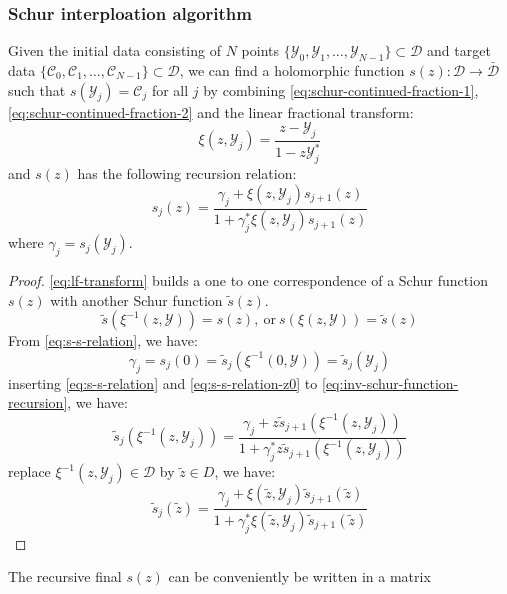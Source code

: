 \documentclass[
	preprint,%
	aps,
	prb,
	showpacs,	
	amsmath, amssymb]{revtex4-2}
\newcommand{\Y}{ {\mathcal{Y}} }
\newcommand{\C}{ {\mathcal{C}} }
\newcommand{\D}{ {\mathcal{D}} }
\newcommand{\Dbar}{ {\bar{\mathcal{D}}} }
\begin{document}
\subsubsection{Schur interploation algorithm}
\label{subsubsec:schur-interpolation-problem}
Given the initial data consisting of $N$ points 
$\{\Y_0, \Y_1, \dots ,\Y_{N-1}\} \subset \D$ and target data
$\{\C_0, \C_1, \dots ,\C_{N-1}\} \subset \D$, 
we can find a holomorphic function $s(z): \D \to \Dbar$ 
such that $s(\Y_j) = \C_j$ for all $j$ by combining 
\cref{eq:schur-continued-fraction-1}, \cref{eq:schur-continued-fraction-2} 
and the linear fractional transform:
\begin{equation}\label{eq:lf-transform}
	\xi(z, \Y_j) = \frac{z - \Y_j}{1 - z\Y_j^*}
\end{equation}
and $s(z)$ has the following recursion relation:
\begin{equation}\label{eq:inv-schur-function-recursion-another-s}
	s_j(z) 
	= \frac{\gamma_j + \xi(z, \Y_j) s_{j+1}(z) }
		{1 + \gamma_j^* \xi(z, \Y_j) s_{j+1}(z)}
\end{equation}
where $\gamma_j = s_j(\Y_j)$.
\begin{proof}
	\cref{eq:lf-transform} builds a one to one correspondence of 
	a Schur function $s(z)$ with another Schur function $\tilde{s}(z)$.
	\begin{equation}\label{eq:s-s-relation}
		\tilde{s}(\xi^{-1}(z, \Y)) = s(z), \ 
		\mathrm{or} \ s(\xi(z, \Y)) = \tilde{s}(z)
	\end{equation}
	From \cref{eq:s-s-relation}, we have:
	\begin{equation}\label{eq:s-s-relation-z0}
		\gamma_j = s_j(0) = \tilde{s}_j(\xi^{-1}(0, \Y)) 
			= \tilde{s}_j(\Y_j)
	\end{equation}
	inserting \cref{eq:s-s-relation} and \cref{eq:s-s-relation-z0}
	to \cref{eq:inv-schur-function-recursion}, we have: 
	\begin{equation}
		\tilde{s}_j(\xi^{-1}(z, \Y_j)) 
		= \frac{\gamma_j + z \tilde{s}_{j+1}(\xi^{-1}(z, \Y_j)) }
			{1 + \gamma_j^* z \tilde{s}_{j+1}(\xi^{-1}(z, \Y_j))}
	\end{equation}
	replace $\xi^{-1}(z, \Y_j) \in \D$ by $\tilde{z} \in D$, we have:
	\begin{equation}
		\tilde{s}_j(\tilde{z}) 
		= \frac{\gamma_j + \xi(\tilde{z}, \Y_j) \tilde{s}_{j+1}(\tilde{z}) }
			{1 + \gamma_j^* \xi(\tilde{z}, \Y_j) \tilde{s}_{j+1}(\tilde{z})}
	\end{equation}
\end{proof}
The recursive final $s(z)$ can be conveniently be written in a matrix
\end{document}
